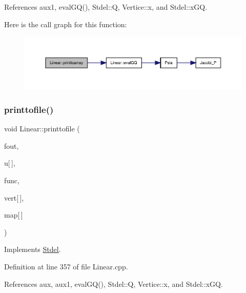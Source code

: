 References aux1, eval\+G\+Q(), Stdel\+::Q, Vertice\+::x, and Stdel\+::x\+GQ.

Here is the call graph for this function\+:
\nopagebreak
\begin{figure}[H]
\begin{center}
\leavevmode
\includegraphics[width=350pt]{classLinear_a0fe2bfc35947baadac5f8b9c0cca5640_cgraph}
\end{center}
\end{figure}
\mbox{\label{classLinear_a6d58a6496896386af09591187d08ab73}} 
\subsubsection{\texorpdfstring{printtofile()}{printtofile()}\hspace{0.1cm}{\footnotesize\ttfamily [1/2]}}
{\footnotesize\ttfamily void Linear\+::printtofile (\begin{DoxyParamCaption}\item[{F\+I\+LE $\ast$}]{fout,  }\item[{const double}]{u\mbox{[}$\,$\mbox{]},  }\item[{double($\ast$)(double, double, double)}]{func,  }\item[{const \hyperlink{structVertice}{Vertice}}]{vert\mbox{[}$\,$\mbox{]},  }\item[{const int}]{map\mbox{[}$\,$\mbox{]} }\end{DoxyParamCaption})\hspace{0.3cm}{\ttfamily [virtual]}}



Implements \hyperlink{classStdel_a315869f4c1fe1fdf4911c0d4ab092176}{Stdel}.



Definition at line 357 of file Linear.\+cpp.



References aux, aux1, eval\+G\+Q(), Stdel\+::Q, Vertice\+::x, and Stdel\+::x\+GQ.

